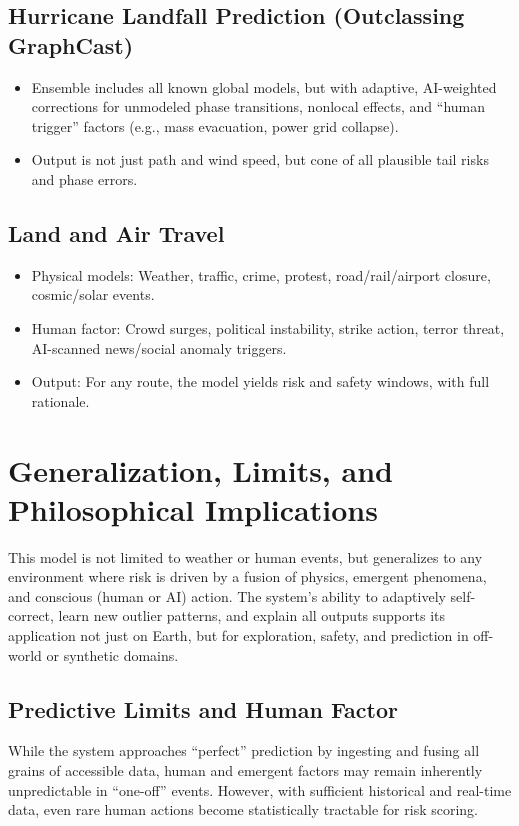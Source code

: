 \documentclass[12pt]{article}
\begin{document}
\subsection{Hurricane Landfall Prediction (Outclassing GraphCast)}
\begin{itemize}
    \item Ensemble includes all known global models, but with adaptive, AI-weighted corrections for unmodeled phase transitions, nonlocal effects, and “human trigger” factors (e.g., mass evacuation, power grid collapse).
    \item Output is not just path and wind speed, but cone of all plausible tail risks and phase errors.
\end{itemize}

\subsection{Land and Air Travel}
\begin{itemize}
    \item Physical models: Weather, traffic, crime, protest, road/rail/airport closure, cosmic/solar events.
    \item Human factor: Crowd surges, political instability, strike action, terror threat, AI-scanned news/social anomaly triggers.
    \item Output: For any route, the model yields risk and safety windows, with full rationale.
\end{itemize}

\section{Generalization, Limits, and Philosophical Implications}
This model is not limited to weather or human events, but generalizes to any environment where risk is driven by a fusion of physics, emergent phenomena, and conscious (human or AI) action. The system’s ability to adaptively self-correct, learn new outlier patterns, and explain all outputs supports its application not just on Earth, but for exploration, safety, and prediction in off-world or synthetic domains.

\subsection{Predictive Limits and Human Factor}
While the system approaches “perfect” prediction by ingesting and fusing all grains of accessible data, human and emergent factors may remain inherently unpredictable in “one-off” events. However, with sufficient historical and real-time data, even rare human actions become statistically tractable for risk scoring.
\end{document}

